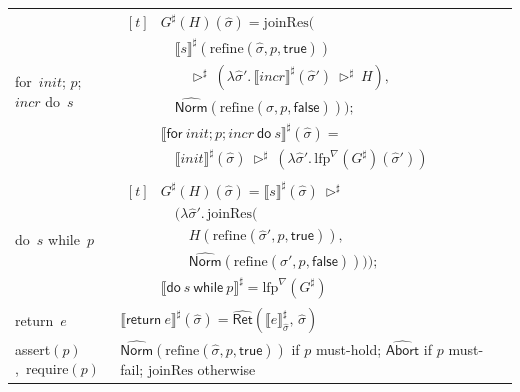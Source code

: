 \documentclass[11pt,oneside]{report}
\theoremstyle{plain}
\theoremstyle{definition}
\theoremstyle{remark}
\newcommand{\Abort}{\mathsf{Abort}}
\newcommand{\Norm}{\mathsf{Norm}}
\newcommand{\Ret}{\mathsf{Ret}}
\begin{document}
\begin{table}[h]
\begin{tabularx}{\columnwidth}{@{}p{} X@{}}
    \textsf{for}\ $init$; $p$; $incr$ \textsf{do}\ $s$ &
    $\begin{aligned}[t]
      &G^\sharp(H)(\hat{\sigma})=\mathrm{joinRes}\big( \\
      &\quad \llbracket s\rrbracket^\sharp(\mathrm{refine}(\hat{\sigma},p,\mathsf{true})) \\
      &\qquad \triangleright^\sharp\ (\lambda \hat{\sigma}'.\,\llbracket incr\rrbracket^\sharp(\hat{\sigma}')\ \triangleright^\sharp\ H),\; \\
      &\quad \widehat{\Norm}(\mathrm{refine}(\hat{\sigma},p,\mathsf{false})) \big);
      \\[2pt]
      &\llbracket \textsf{for}\ init; p; incr\ \textsf{do}\ s\rrbracket^\sharp(\hat{\sigma})= \\
      &\quad \llbracket init\rrbracket^\sharp(\hat{\sigma})\ \triangleright^\sharp\ (\lambda \hat{\sigma}'.\,\mathrm{lfp}^{\nabla}(G^\sharp)(\hat{\sigma}'))
    \end{aligned}$\\

    \textsf{do}\ $s$ \textsf{while}\ $p$ &
    $\begin{aligned}[t]
      &G^\sharp(H)(\hat{\sigma})=\llbracket s\rrbracket^\sharp(\hat{\sigma})\ \triangleright^\sharp \\
      &\quad (\lambda \hat{\sigma}'.\,\mathrm{joinRes}\big( \\
      &\qquad H(\mathrm{refine}(\hat{\sigma}',p,\mathsf{true})),\; \\
      &\qquad \widehat{\Norm}(\mathrm{refine}(\hat{\sigma}',p,\mathsf{false})) \big));
      \\[2pt]
      &\llbracket \textsf{do}\ s\ \textsf{while}\ p\rrbracket^\sharp = \mathrm{lfp}^{\nabla}(G^\sharp)
    \end{aligned}$\\

    \textsf{return}\ $e$ &
    $\llbracket \textsf{return}\ e\rrbracket^\sharp(\hat{\sigma})=\widehat{\Ret}(\llbracket e\rrbracket^\sharp_{\hat{\sigma}},\,\hat{\sigma})$\\

    \textsf{assert}$(p)$,\ \textsf{require}$(p)$ &
    $\widehat{\Norm}(\mathrm{refine}(\hat{\sigma},p,\mathsf{true}))$ if $p$ must-hold; $\widehat{\Abort}$ if $p$ must-fail; $\mathrm{joinRes}$ otherwise\\


\end{tabularx}
\end{table}
\end{document}
